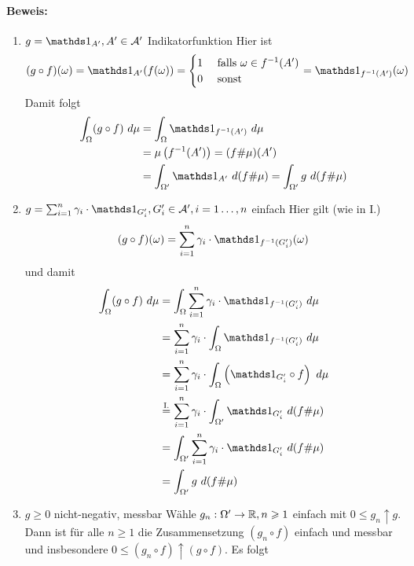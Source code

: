 \documentclass[12pt]{report}
\begin{document}
 \paragraph{Beweis:}
 \begin{enumerate}[label=\Roman*.]
     \item $g=\ind{A'},A'\in\A'$ Indikatorfunktion\newline
     Hier ist 
     \begin{align*}
         (g\circ f)(\omega)=\ind{A'}(f(\omega))=
         \begin{cases}
             1&\text{ falls }\omega\in f^{-1}(A')\\
             0&\text{ sonst}
         \end{cases}
         =\ind{f^{-1}(A')}(\omega)
     \end{align*}
     Damit folgt
     \begin{align*}
         \int_{\Omega}(g\circ f)\ d\mu&=\int_{\Omega}\ind{f^{-1}(A')}\ d\mu\\
         &=\mu\left(f^{-1}(A')\right)=(f\#\mu)(A')\\
         &=\int_{\Omega'}\ind{A'}\ d(f\#\mu)=\int_{\Omega'}g\ d(f\#\mu)
     \end{align*}
     \item $g=\sum_{i=1}^n\gamma_i\cdot\ind{G_i'},G_i'\in\A',i=1\hdots,n$ einfach\newline
     Hier gilt (wie in I.) 
     $$(g\circ f)(\omega)=\sum_{i=1}^n\gamma_i\cdot\ind{f^{-1}(G_i')}(\omega)$$
     und damit 
     \begin{align*}
         \int_{\Omega}(g\circ f)\ d\mu&=\int_{\Omega}\sum_{i=1}^n\gamma_i\cdot\ind{f^{-1}(G_i')}\ d\mu\\
         &=\sum_{i=1}^n\gamma_i\cdot\int_{\Omega}\ind{f^{-1}(G_i')}\ d\mu\\
         &=\sum_{i=1}^n\gamma_i\cdot\int_{\Omega}\left(\ind{G_i'}\circ f\right)\ d\mu\\
         &\overset{\text{I.}}{=}\sum_{i=1}^n\gamma_i\cdot\int_{\Omega'}\ind{G_i'}\ d(f\#\mu)\\
         &=\int_{\Omega'}\sum_{i=1}^n\gamma_i\cdot\ind{G_i'}\ d(f\#\mu)\\
         &=\int_{\Omega'}g\ d(f\#\mu)
     \end{align*}
     \item $g\geq 0$ nicht-negativ, messbar\newline
     W\"ahle $g_n:\Omega'\to\mathbb{R},n\geqslant1$ einfach mit $0\leq g_n\uparrow g$. Dann ist f\"ur alle $n\geq1$ die Zusammensetzung $(g_n\circ f)$ einfach und messbar und insbesondere $0\leq (g_n\circ f)\uparrow (g\circ f)$. Es folgt

\end{enumerate}
\end{document}
